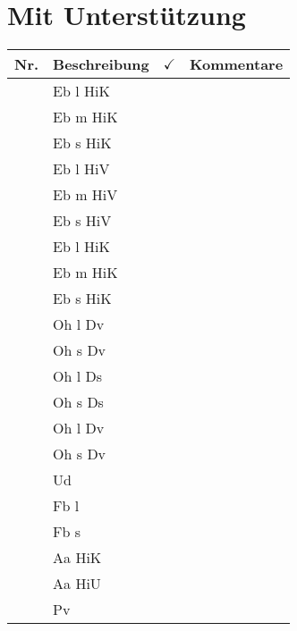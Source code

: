 \documentclass{article}
\newcommand{\incRun}{ \addtocounter{run}{1} }
\newcommand{\nRun}{\incRun \arabic{run}}
\begin{document}
\section{Mit Unterst\"utzung}
\begin{center}
  \begin{tabular}{ >{\raggedleft} p{} | p{} |p{} |p{}}
    \textbf{Nr.}  & \textbf{Beschreibung} & $\checkmark$ & \textbf{Kommentare}\\ \hline
\nRun & Eb l HiK & &\\  \hline
\nRun & Eb m HiK & &\\  \hline
\nRun & Eb s HiK & &\\  \hline
\nRun & Eb l HiV & &\\  \hline
\nRun & Eb m HiV & &\\  \hline
\nRun & Eb s HiV & &\\  \hline
\nRun & Eb l HiK & &\\  \hline
\nRun & Eb m HiK & &\\  \hline
\nRun & Eb s HiK & &\\  \hline
\nRun & Oh l Dv & &\\  \hline
\nRun & Oh s Dv & &\\  \hline
\nRun & Oh l Ds & &\\  \hline
\nRun & Oh s Ds & &\\  \hline
\nRun & Oh l Dv & &\\  \hline
\nRun & Oh s Dv & &\\  \hline
\nRun & Ud & &\\  \hline
\nRun & Fb l & &\\  \hline
\nRun & Fb s & &\\  \hline
\nRun & Aa HiK & &\\  \hline
\nRun & Aa HiU & &\\  \hline
\nRun & Pv   & &\\  
  \end{tabular}
\end{center}
\end{document}
